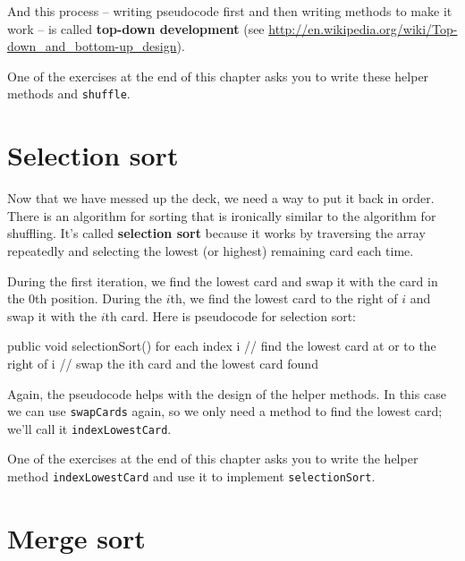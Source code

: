 \documentclass[12pt]{book}
\theoremstyle{exercise}
\newcommand{\java}[1]{\verb"#1"}
\begin{document}

And this process -- writing pseudocode first and then writing methods to make it work -- is called {\bf top-down development} (see \url{http://en.wikipedia.org/wiki/Top-down_and_bottom-up_design}).


One of the exercises at the end of this chapter asks you to write these helper methods and \java{shuffle}.


\section{Selection sort}
\label{sorting}


Now that we have messed up the deck, we need a way to put it back in order.
There is an algorithm for sorting that is ironically similar to the algorithm for shuffling.
It's called {\bf selection sort} because it works by traversing the array repeatedly and selecting the lowest (or highest) remaining card each time.

During the first iteration, we find the lowest card and swap it with the card in the 0th position.
During the $i$th, we find the lowest card to the right of $i$ and swap it with the $i$th card.
Here is pseudocode for selection sort:

\begin{code}
public void selectionSort() {
    for each index i {
        // find the lowest card at or to the right of i
        // swap the ith card and the lowest card found
    }
}
\end{code}


Again, the pseudocode helps with the design of the helper methods.
In this case we can use \java{swapCards} again, so we only need a method to find the lowest card; we'll call it \java{indexLowestCard}.

One of the exercises at the end of this chapter asks you to write the helper method \java{indexLowestCard} and use it to implement \java{selectionSort}.


\section{Merge sort}
\label{mergesort}
\end{document}
